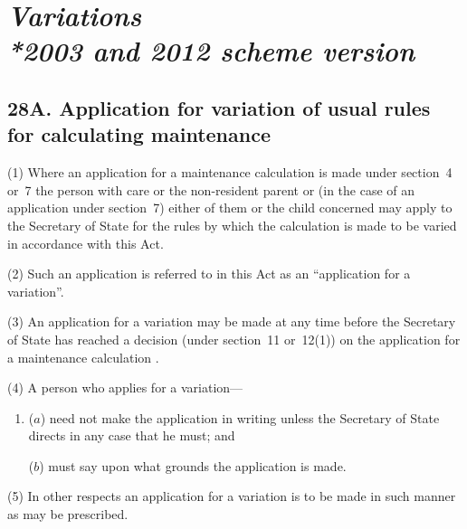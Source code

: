 \documentclass[12pt,a4paper]{article}
\begin{document}
\section[\itshape Variations --- \emph{2003 and 2012 scheme version}]{\itshape Variations\\*\emph{2003 and 2012 scheme version}}

\subsection{28A. Application for variation of usual rules for calculating maintenance}

(1) Where an application for a maintenance calculation is made under section~4 or~7
the person with care or the non-resident parent or (in the case of an application under section~7) either of them or the child concerned may apply to the 
Secretary of State  %
for the rules by which the calculation is made to be varied in accordance with this Act.

(2) Such an application is referred to in this Act as an “application for a variation”.

(3) An application for a variation may be made at any time before the 
Secretary of State  %
has reached a decision (under section~11 or~12(1)) on the application for a maintenance calculation%
.

(4) A person who applies for a variation—
\begin{enumerate}\item[]
($a$) need not make the application in writing unless the 
Secretary of State  %
directs in any case that he must; and

($b$) must say upon what grounds the application is made.
\end{enumerate}

(5) In other respects an application for a variation is to be made in such manner as may be prescribed.
\end{document}
